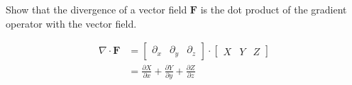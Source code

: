 Show that the divergence of a vector field $\boldsymbol{F}$ is the dot product of the gradient operator with the vector field.

\begin{solution}
\begin{align*}
    \nabla \cdot \boldsymbol{F} &= \begin{bmatrix}\partial_x & \partial_y & \partial_z\end{bmatrix} \cdot \begin{bmatrix} X & Y & Z\end{bmatrix} \\
    &= \frac{\partial X}{\partial x} + \frac{\partial Y}{\partial y} + \frac{\partial Z}{\partial z}
\end{align*}
\end{solution}